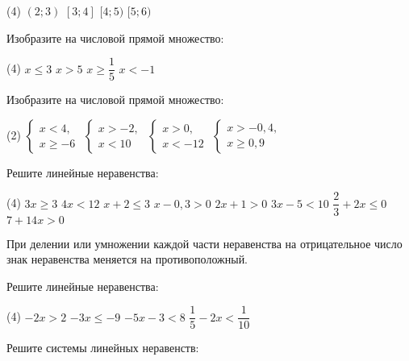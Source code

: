 \begin{class}[number=5]
\begin{listofex}
		\begin{tasks}(4)
			\task \( (2;3) \)
			\task \( [3;4] \)
			\task \( [4;5) \)
			\task \( [5;6) \)
		\end{tasks}
		\item Изобразите на числовой прямой множество:
		\begin{tasks}(4)
			\task \( x\leq3 \)
			\task \( x>5 \)
			\task \( x\geq\dfrac{1}{5} \)
			\task \( x<-1 \)
		\end{tasks}
		\item Изобразите на числовой прямой множество:
		\begin{tasks}(2)
			\task \( \left\{
			\begin{array}{l}
				x<4,\\
				x\geq-6
			\end{array}
			\right. \)
			\task \( \left\{
			\begin{array}{l}
				x>-2,\\
				x<10
			\end{array}
			\right. \)
			\task \( \left\{
			\begin{array}{l}
				x>0,\\
				x<-12
			\end{array}
			\right. \)
			\task \( \left\{
			\begin{array}{l}
				x>-0,4,\\
				x\geq0,9
			\end{array}
			\right. \)
		\end{tasks}
		\item Решите линейные неравенства:
		\begin{tasks}(4)
			\task \( 3x\geq3 \)
			\task \( 4x<12 \)
			\task \( x+2\leq3 \)
			\task \( x-0,3>0 \)
			\task \( 2x+1>0 \)
			\task \( 3x-5<10\)
			\task \( \dfrac{2}{3}+2x\leq0 \)
			\task \( 7+14x>0 \)
		\end{tasks}
	\end{listofex}
	\begin{definit}
		При делении или умножении каждой части неравенства на отрицательное число знак неравенства меняется на противоположный. 
	\end{definit}
	\begin{listofex}[resume]
		\item Решите линейные неравенства:
		\begin{tasks}(4)
			\task \( -2x>2 \)
			\task \( -3x\leq-9 \)
			\task \( -5x-3<8 \)
			\task \( \dfrac{1}{5}-2x<\dfrac{1}{10} \)
		\end{tasks}
		\item Решите системы линейных неравенств:

\end{listofex}
\end{class}
